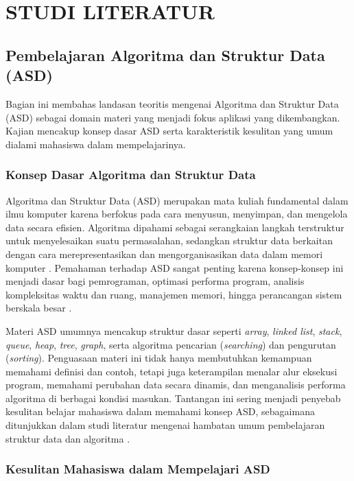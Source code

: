 \cleardoublepage %
\chapter{STUDI LITERATUR}
\label{chap:studi-literatur}

\section{Pembelajaran Algoritma dan Struktur Data (ASD)}

Bagian ini membahas landasan teoritis mengenai Algoritma dan Struktur Data (ASD) sebagai domain materi yang menjadi fokus aplikasi yang dikembangkan. Kajian mencakup konsep dasar ASD serta karakteristik kesulitan yang umum dialami mahasiswa dalam mempelajarinya.

\subsection{Konsep Dasar Algoritma dan Struktur Data}

Algoritma dan Struktur Data (ASD) merupakan mata kuliah fundamental dalam ilmu komputer karena berfokus pada cara menyusun, menyimpan, dan mengelola data secara efisien. Algoritma dipahami sebagai serangkaian langkah terstruktur untuk menyelesaikan suatu permasalahan, sedangkan struktur data berkaitan dengan cara merepresentasikan dan mengorganisasikan data dalam memori komputer \cite{Cormen2009CLRS}. Pemahaman terhadap ASD sangat penting karena konsep-konsep ini menjadi dasar bagi pemrograman, optimasi performa program, analisis kompleksitas waktu dan ruang, manajemen memori, hingga perancangan sistem berskala besar \cite{Goodrich1998DSAJava}.

Materi ASD umumnya mencakup struktur dasar seperti \textit{array}, \textit{linked list}, \textit{stack}, \textit{queue}, \textit{heap}, \textit{tree}, \textit{graph}, serta algoritma pencarian (\textit{searching}) dan pengurutan (\textit{sorting}). Penguasaan materi ini tidak hanya membutuhkan kemampuan memahami definisi dan contoh, tetapi juga keterampilan menalar alur eksekusi program, memahami perubahan data secara dinamis, dan menganalisis performa algoritma di berbagai kondisi masukan. Tantangan ini sering menjadi penyebab kesulitan belajar mahasiswa dalam memahami konsep ASD, sebagaimana ditunjukkan dalam studi literatur mengenai hambatan umum pembelajaran struktur data dan algoritma \cite{Mtaho2024}.

\subsection{Kesulitan Mahasiswa dalam Mempelajari ASD}

